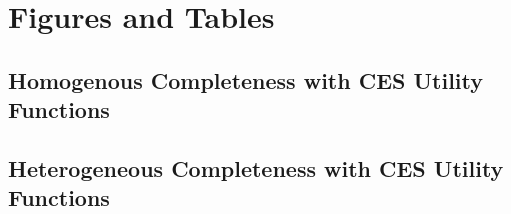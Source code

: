 \documentclass[letterpaper,11pt,leqno]{article}
\begin{document}




\section{Figures and Tables}\label{a:appendix2}

\subsection[short]{Homogenous Completeness with CES Utility Functions}

\subsection[short]{Heterogeneous Completeness with CES Utility Functions}
\end{document}

